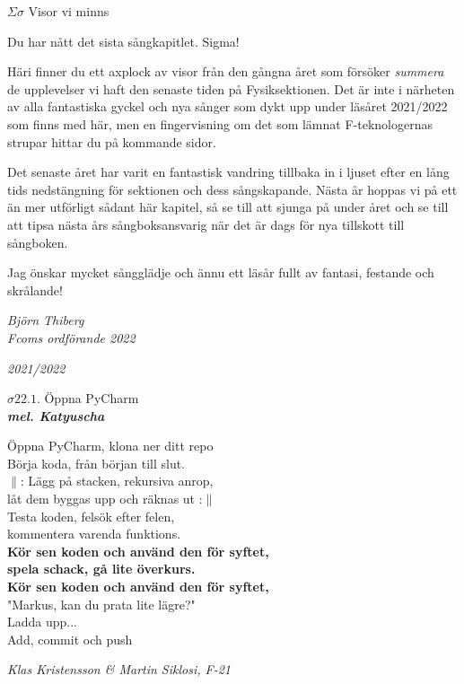 \documentclass[a6paper,10pt]{article}
\newcommand{\mel}[1]{\small\textbf{\textit{mel. #1 \\}}}
\begin{document}
\noindent
\huge{$\Sigma\sigma$ Visor vi minns}
\vspace{10pt}

\noindent
\small
Du har nått det sista sångkapitlet. Sigma! 

Häri finner du ett axplock av visor från den gångna året som försöker \textit{summera} de upplevelser vi haft den senaste tiden på Fysiksektionen. Det är inte i närheten av alla fantastiska gyckel och nya sånger som dykt upp under läsåret 2021/2022 som finns med här, men en fingervisning om det som lämnat F-teknologernas strupar hittar du på kommande sidor. 

Det senaste året har varit en fantastisk vandring tillbaka in i ljuset efter en lång tids nedstängning för sektionen och dess sångskapande. Nästa år hoppas vi på ett än mer utförligt sådant här kapitel, så se till att sjunga på under året och se till att tipsa nästa års sångboksansvarig när det är dags för nya tillskott till sångboken.

Jag önskar mycket sångglädje och ännu ett läsår fullt av fantasi, festande och skrålande!
\begin{flushright}
\textit{Björn Thiberg \\Fcoms ordförande 2022}
\end{flushright}
\setlength{\oddsidemargin}{-0.47in}

\begin{center}
\huge \textit{2021/2022}
\end{center}


\begin{center}
\Large $\sigma22.1$. Öppna PyCharm\\
\mel{Katyuscha} 
\end{center}
Öppna PyCharm, klona ner ditt repo \\
Börja koda, från början till slut. \\
$\|$: Lägg på stacken, rekursiva anrop, \\
låt dem byggas upp och räknas ut :$\|$
\vspace{5pt}\\
Testa koden, felsök efter felen, \\
kommentera varenda funktions. \\
\textbf{Kör sen koden och använd den för syftet, \\
spela schack, gå lite överkurs. \\
Kör sen koden och använd den för syftet, }
\vspace{5pt}\\
"Markus, kan du prata lite lägre?"
\vspace{5pt}\\
Ladda upp...\\
Add, commit och push\\
\begin{flushright}
\textit{Klas Kristensson \& Martin Siklosi, F-21}
\end{flushright}
\end{document}
